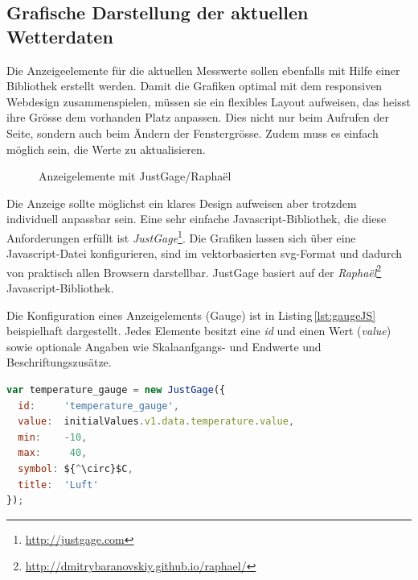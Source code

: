 \subsection{Grafische Darstellung der aktuellen Wetterdaten}
Die Anzeigeelemente für die aktuellen Messwerte sollen ebenfalls mit Hilfe einer Bibliothek erstellt werden. Damit die Grafiken optimal mit dem responsiven Webdesign zusammenspielen, müssen sie ein flexibles Layout aufweisen, das heisst ihre Grösse dem vorhanden Platz anpassen. Dies nicht nur beim Aufrufen der Seite, sondern auch beim Ändern der Fenstergrösse. Zudem muss es einfach möglich sein, die Werte zu aktualisieren.

\begin{figure}[h!]
	\centering
	\caption{Anzeigelemente mit JustGage/Raphaël}
	\label{img:gauges}
\end{figure}

\noindent
Die Anzeige sollte möglichst ein klares Design aufweisen aber trotzdem individuell anpassbar sein. Eine sehr einfache Javascript-Bibliothek, die diese Anforderungen erfüllt ist \emph{JustGage}\footnote{ \url{http://justgage.com}}. Die Grafiken lassen sich über eine Javascript-Datei konfigurieren, sind im vektorbasierten svg-Format und dadurch von praktisch allen Browsern darstellbar. JustGage basiert auf der \textit{Raphaël}\footnote{ \url{http://dmitrybaranovskiy.github.io/raphael/}} Javascript-Bibliothek.

\noindent
Die Konfiguration eines Anzeigelements (Gauge) ist in Listing\,\ref{lst:gaugeJS} beispielhaft dargestellt. Jedes Elemente besitzt eine \emph{id} und einen Wert (\emph{value}) sowie optionale Angaben wie Skalaanfgangs- und Endwerte und Beschriftungszusätze.

\vspace{3mm}
\begin{lstlisting}[label=lst:gaugeJS,caption=Konfiguration einer Gauge in Javascript, language=JavaScript, mathescape, style=htmlcssjs]
var temperature_gauge = new JustGage({
  id:     'temperature_gauge',
  value:  initialValues.v1.data.temperature.value,
  min:    -10,
  max:     40,
  symbol: ${^\circ}$C,
  title:  'Luft'
});
\end{lstlisting}
\vspace{3mm}

